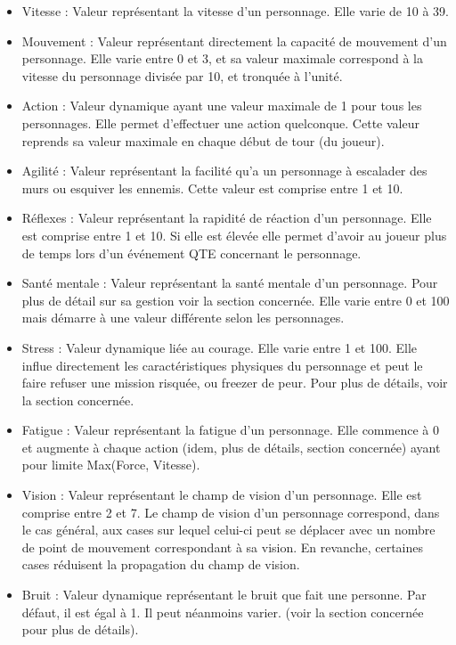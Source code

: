 \begin{itemize}
  \item Vitesse : Valeur représentant la vitesse d'un personnage. Elle varie de 10 à 39.
  \item Mouvement : Valeur représentant directement la capacité de mouvement d'un personnage. Elle varie entre 0 et 3, et sa valeur maximale correspond à la vitesse du personnage divisée par 10, et tronquée à l'unité.
  \item Action : Valeur dynamique ayant une valeur maximale de 1 pour tous les personnages. Elle permet d'effectuer une action quelconque. Cette valeur reprends sa valeur maximale en chaque début de tour (du joueur).
  \item Agilité : Valeur représentant la facilité qu'a un personnage à escalader des murs ou esquiver les ennemis. Cette valeur est comprise entre 1 et 10.
  \item Réflexes : Valeur représentant la rapidité de réaction d'un personnage. Elle est comprise entre 1 et 10. Si elle est élevée elle permet d'avoir au joueur plus de temps lors d'un événement QTE concernant le personnage.
  \item Santé mentale : Valeur représentant la santé mentale d'un personnage. Pour plus de détail sur sa gestion voir la section concernée. Elle varie entre 0 et 100 mais démarre à une valeur différente selon les personnages.
  \item Stress : Valeur dynamique liée au courage. Elle varie entre 1 et 100. Elle influe directement les caractéristiques physiques du personnage et peut le faire refuser une mission risquée, ou freezer de peur. Pour plus de détails, voir la section concernée.
  \item Fatigue : Valeur représentant la fatigue d'un personnage. Elle commence à 0 et augmente à chaque action (idem, plus de détails, section concernée) ayant pour limite Max(Force, Vitesse).
  \item Vision : Valeur représentant le champ de vision d'un personnage. Elle est comprise entre 2 et 7. Le champ de vision d'un personnage correspond, dans le cas général, aux cases sur lequel celui-ci peut se déplacer avec un nombre de point de mouvement correspondant à sa vision. En revanche, certaines cases réduisent la propagation du champ de vision.
  \item Bruit : Valeur dynamique représentant le bruit que fait une personne. Par défaut, il est égal à 1. Il peut néanmoins varier. (voir la section concernée pour plus de détails).
\end{itemize}

